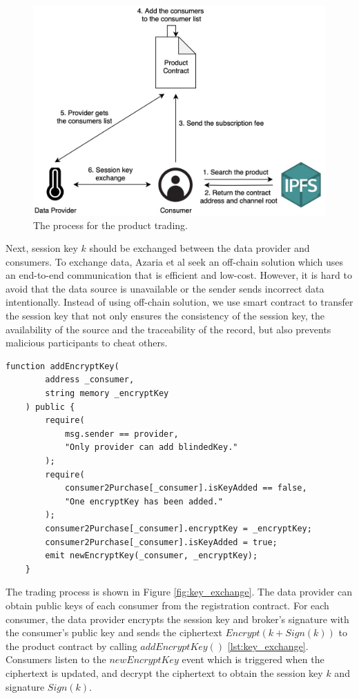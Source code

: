 \documentclass[journal,article,applsci,submit,moreauthors,pdftex]{Definitions/mdpi}
\begin{document}
\begin{figure}[H]
    \centering
    \includegraphics[width=3.3 in]{trading_product}
    \caption{The process for the product trading.}
    \label{fig:trading_product}
\end{figure}

Next, session key $k$ should be exchanged between the data provider and consumers. To exchange data, Azaria et al\cite{Medrec} seek an off-chain solution which uses an end-to-end communication that is efficient and low-cost. However, it is hard to avoid that the data source is unavailable or the sender sends incorrect data intentionally. Instead of using off-chain solution, we use smart contract to transfer the session key\cite{3tierDataMarket} that not only ensures the consistency of the session key, the availability of the source and the traceability of the record, but also prevents malicious participants to cheat others.

\begin{lstlisting}[caption={update encrypt key}, label={lst:key_exchange}, frame=single]
    function addEncryptKey(
        address _consumer,
        string memory _encryptKey
    ) public {
        require(
            msg.sender == provider,
            "Only provider can add blindedKey."
        );
        require(
            consumer2Purchase[_consumer].isKeyAdded == false,
            "One encryptKey has been added."
        );
        consumer2Purchase[_consumer].encryptKey = _encryptKey;
        consumer2Purchase[_consumer].isKeyAdded = true;
        emit newEncryptKey(_consumer, _encryptKey);
    }
\end{lstlisting}

The trading process is shown in Figure \ref{fig:key_exchange}. The data provider can obtain public keys of each consumer from the registration contract. For each consumer, the data provider encrypts the session key and broker's signature with the consumer's public key and sends the ciphertext $Encrypt(k + Sign(k))$ to the product contract by calling $addEncryptKey()$ \ref{lst:key_exchange}. Consumers listen to the $newEncryptKey$ event which is triggered when the ciphertext is updated, and decrypt the ciphertext to obtain the session key $k$ and signature $Sign(k)$.
\end{document}
